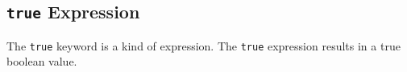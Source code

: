 
\subsection{\texttt{true} Expression}
{
	The \lstinline[language=MAIA, columns=fixed]@true@ keyword is a kind of expression.
	The \texttt{true} expression results in a true boolean value.
}
